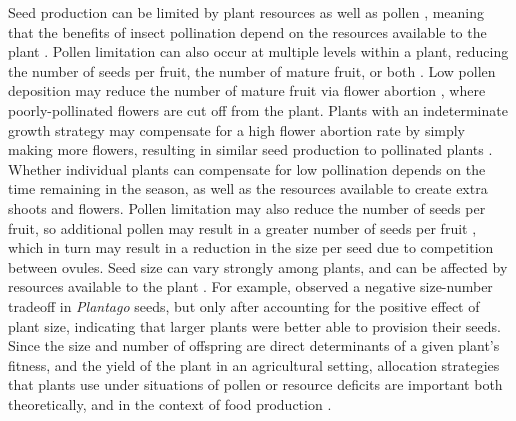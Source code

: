 \documentclass[12pt, draft]{article} %
\begin{document}
Seed production can be limited by plant resources as well as pollen \citep{galen1985, haig1988,campbell1993}, meaning that the benefits of insect pollination depend on the resources available to the plant \citep{stephenson1981, tamburini2017}.
Pollen limitation can also occur at multiple levels within a plant, reducing the number of seeds per fruit, the number of mature fruit, or both \citep{burd1994}.
Low pollen deposition may reduce the number of mature fruit via flower abortion \citep{knight2006}, where poorly-pollinated flowers are cut off from the plant.
Plants with an indeterminate growth strategy may compensate for a high flower abortion rate by simply making more flowers, resulting in similar seed production to pollinated plants \citep{doust1982,lawrence1993, sabbahi2006, bos2007}.
Whether individual plants can compensate for low pollination depends on the time remaining in the season, as well as the resources available to create extra shoots and flowers.
Pollen limitation may also reduce the number of seeds per fruit, so additional pollen may result in a greater number of seeds per fruit \citep{knight2006}, which in turn may result in a reduction in the size per seed \citep{free1968, mazer1987} due to competition between ovules.
Seed size can vary strongly among plants, and can be affected by resources available to the plant \citep{mazer1987, venable1992}. 
For example, \citet{maddox1983} observed a negative size-number tradeoff in \emph{Plantago} seeds, but only after accounting for the positive effect of plant size, indicating that larger plants were better able to provision their seeds.
Since the size and number of offspring are direct determinants of a given plant's fitness, and the yield of the plant in an agricultural setting, allocation strategies that plants use under situations of pollen or resource deficits are important both theoretically, and in the context of food production \citep{bos2007, tamburini2019}. 
\end{document}
